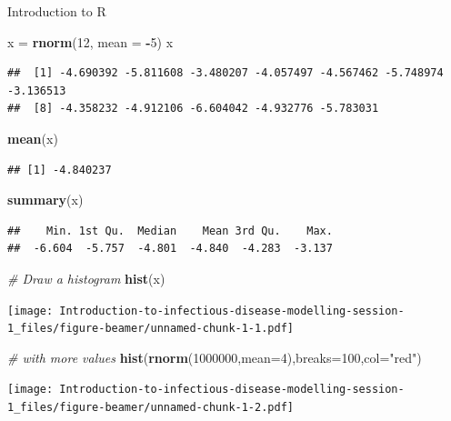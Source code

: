 \documentclass[
  ignorenonframetext,
]{beamer}
\newenvironment{Shaded}{\begin{snugshade}}{\end{snugshade}}
\newcommand{\AttributeTok}[1]{\textcolor[rgb]{0.13,0.29,0.53}{#1}}
\newcommand{\CommentTok}[1]{\textcolor[rgb]{0.56,0.35,0.01}{\textit{#1}}}
\newcommand{\DecValTok}[1]{\textcolor[rgb]{0.00,0.00,0.81}{#1}}
\newcommand{\FunctionTok}[1]{\textcolor[rgb]{0.13,0.29,0.53}{\textbf{#1}}}
\newcommand{\NormalTok}[1]{#1}
\newcommand{\OtherTok}[1]{\textcolor[rgb]{0.56,0.35,0.01}{#1}}
\newcommand{\SpecialCharTok}[1]{\textcolor[rgb]{0.81,0.36,0.00}{\textbf{#1}}}
\newcommand{\StringTok}[1]{\textcolor[rgb]{0.31,0.60,0.02}{#1}}
\begin{document}
\begin{frame}[fragile]{Introduction to R}
\protect\hypertarget{introduction-to-r}{}
\begin{Shaded}
\begin{Highlighting}[]
\NormalTok{x }\OtherTok{=} \FunctionTok{rnorm}\NormalTok{(}\DecValTok{12}\NormalTok{, }\AttributeTok{mean =} \SpecialCharTok{{-}}\DecValTok{5}\NormalTok{)}
\NormalTok{x }
\end{Highlighting}
\end{Shaded}

\begin{verbatim}
##  [1] -4.690392 -5.811608 -3.480207 -4.057497 -4.567462 -5.748974 -3.136513
##  [8] -4.358232 -4.912106 -6.604042 -4.932776 -5.783031
\end{verbatim}

\begin{Shaded}
\begin{Highlighting}[]
\FunctionTok{mean}\NormalTok{(x)}
\end{Highlighting}
\end{Shaded}

\begin{verbatim}
## [1] -4.840237
\end{verbatim}

\begin{Shaded}
\begin{Highlighting}[]
\FunctionTok{summary}\NormalTok{(x)}
\end{Highlighting}
\end{Shaded}

\begin{verbatim}
##    Min. 1st Qu.  Median    Mean 3rd Qu.    Max. 
##  -6.604  -5.757  -4.801  -4.840  -4.283  -3.137
\end{verbatim}

\begin{Shaded}
\begin{Highlighting}[]
\CommentTok{\# Draw a histogram}
\FunctionTok{hist}\NormalTok{(x)}
\end{Highlighting}
\end{Shaded}

\texttt{[image: Introduction-to-infectious-disease-modelling-session-1\_files/figure-beamer/unnamed-chunk-1-1.pdf]}

\begin{Shaded}
\begin{Highlighting}[]
\CommentTok{\# with more values}
\FunctionTok{hist}\NormalTok{(}\FunctionTok{rnorm}\NormalTok{(}\DecValTok{1000000}\NormalTok{,}\AttributeTok{mean=}\DecValTok{4}\NormalTok{),}\AttributeTok{breaks=}\DecValTok{100}\NormalTok{,}\AttributeTok{col=}\StringTok{"red"}\NormalTok{)}
\end{Highlighting}
\end{Shaded}

\texttt{[image: Introduction-to-infectious-disease-modelling-session-1\_files/figure-beamer/unnamed-chunk-1-2.pdf]}
\end{frame}
\end{document}
